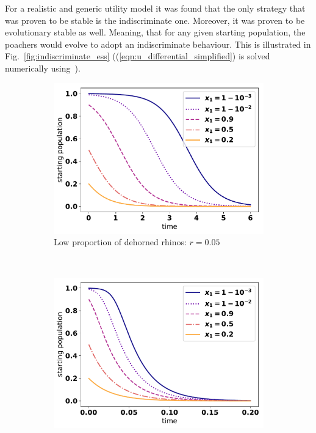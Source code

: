 \documentclass[10pt]{article}
\begin{document}
For a realistic and generic utility model it was found that
the only strategy that was proven to be stable is the indiscriminate one.
Moreover, it was proven to be evolutionary stable as well. Meaning, 
that for any given starting population, the poachers would evolve to adopt an
indiscriminate behaviour. This is illustrated in 
Fig.~\ref{fig:indiscriminate_ess} ((\ref{eqn:u_differential_simplified}) is 
solved numerically using~\cite{scipy}).

\begin{figure}[!htbp]
    \centering
    \begin{subfigure}{.3\textwidth}
    \includegraphics[width=\textwidth]{images/IndiscriminateESS-low-r.pdf}
    \caption{Low proportion of dehorned rhinos: \(r=0.05\)}
    \end{subfigure}%
    ~
    \begin{subfigure}{.3\textwidth}
    \includegraphics[width=\textwidth]{images/IndiscriminateESS.pdf}

\end{subfigure}
\end{figure}
\end{document}
